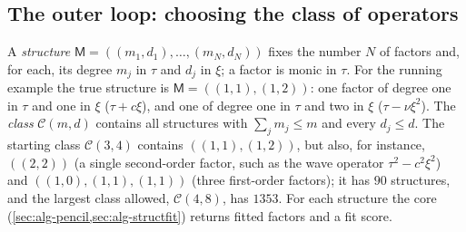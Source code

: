 \documentclass[11pt]{article}
\theoremstyle{plain}
\theoremstyle{definition}
\theoremstyle{remark}
\newcommand{\Mfit}{\mathsf{M}}              %
\begin{document}


\subsection{The outer loop: choosing the class of operators}\label{sec:alg-loop}
A \emph{structure} $\Mfit=((m_1,d_1),\dots,(m_N,d_N))$ fixes the number $N$ of factors and, for each,
its degree $m_j$ in $\tau$ and $d_j$ in $\xi$; a factor is monic in $\tau$. For the running example the true structure is
$\Mfit=((1,1),(1,2))$: one factor of degree one in $\tau$ and one in $\xi$ ($\tau+c\xi$), and one of degree one in $\tau$
and two in $\xi$ ($\tau-\nu\xi^2$). The \emph{class} $\mathcal C(m,d)$ contains all structures with $\sum_jm_j\le m$ and
every $d_j\le d$. The starting class $\mathcal C(3,4)$ contains $((1,1),(1,2))$, but also, for instance, $((2,2))$ (a single
second-order factor, such as the wave operator $\tau^2-c^2\xi^2$) and $((1,0),(1,1),(1,1))$ (three first-order factors);
it has $90$ structures, and the largest class allowed, $\mathcal C(4,8)$, has $1353$. For each structure the core
(\cref{sec:alg-pencil,sec:alg-structfit}) returns fitted factors and a fit score.
\end{document}
